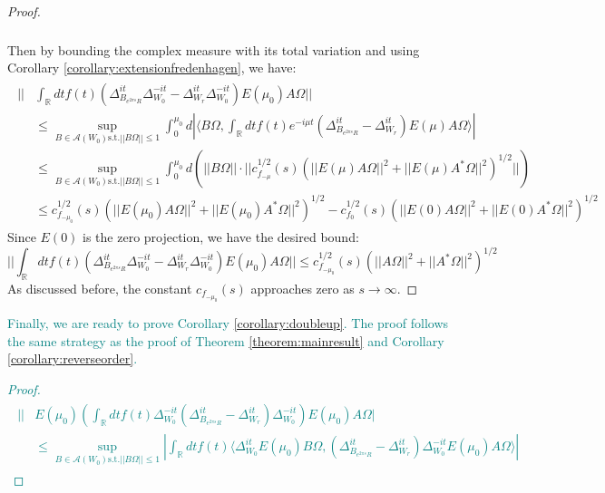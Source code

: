 \documentclass[a4paper,11pt]{article}
\theoremstyle{definition}
\newcommand{\lb}{\left(}
\newcommand{\rb}{\right)}
\newcommand{\YC}[1]{\textcolor{teal}{#1}}
\begin{document}
{{\begin{proof}
\begin{align}
\begin{split}
    \end{split}
\end{align}
Then by bounding the complex measure with its total variation and using Corollary \ref{corollary:extensionfredenhagen}, we have:
\begin{align}
    \begin{split}
        ||&\int_\mathbb{R} dt f(t)\lb\Delta_{B_{e^{2
        \pi s}R}}^{it}\Delta_{W_0}^{-it} - \Delta_{W_r}^{it}\Delta_{W_0}^{-it}\rb E(\mu_0)A\Omega||\\&
        \leq \sup_{B\in\mathcal{A}(W_0)\text{s.t.}||B\Omega||\leq 1}\int_0^{\mu_0}d|\langle B\Omega, \int_\mathbb{R} dt f(t)e^{-i\mu t}\lb\Delta_{B_{e^{2\pi s}R}}^{it} - \Delta_{W_r}^{it}\rb E(\mu) A\Omega\rangle|
        \\&
        \leq \sup_{B\in\mathcal{A}(W_0)\text{s.t.}||B\Omega||\leq 1}\int_0^{\mu_0}d\lb||B\Omega||\cdot||c^{1/2}_{f_{-\mu}}(s)\lb||E(\mu)A\Omega||^2 + ||E(\mu)A^*\Omega||^2\rb^{1/2}||\rb
        \\&
        \leq c^{1/2}_{f_{-\mu_0}}(s)\lb||E(\mu_0)A\Omega||^2 + ||E(\mu_0)A^*\Omega||^2\rb^{1/2} - c^{1/2}_{f_0}(s)\lb||E(0)A\Omega||^2 + ||E(0)A^*\Omega||^2\rb^{1/2}
    \end{split}
\end{align}
Since $E(0)$ is the zero projection, we have the desired bound:
\begin{equation}
    ||\int_\mathbb{R} dt f(t)\lb\Delta_{B_{e^{2
        \pi s}R}}^{it}\Delta_{W_0}^{-it} - \Delta_{W_r}^{it}\Delta_{W_0}^{-it}\rb E(\mu_0)A\Omega|| \leq c_{f_{-\mu_0}}^{1/2}(s)\lb||A\Omega||^2 + ||A^*\Omega||^2\rb^{1/2}
\end{equation}
As discussed before, the constant $c_{f_{-\mu_0}}(s)$ approaches zero as $s\rightarrow\infty$.
\end{proof}
}
\YC{
Finally, we are ready to prove Corollary \ref{corollary:doubleup}. The proof follows the same strategy as the proof of Theorem \ref{theorem:mainresult} and Corollary \ref{corollary:reverseorder}.
\begin{proof}
    \begin{align}
        \begin{split}
            ||&E(\mu_0)\lb\int_\mathbb{R} dt f(t)\Delta_{W_0}^{-it}\lb\Delta_{B_{e^{2\pi s}R}}^{it} - \Delta_{W_r}^{it}\rb\Delta_{W_0}^{-it}\rb E(\mu_0)A\Omega|
            \\&
            \leq \sup_{B\in\mathcal{A}(W_0)\text{s.t.}||B\Omega||\leq 1}|\int_\mathbb{R} dt f(t)\langle \Delta^{it}_{W_0}E(\mu_0)B\Omega, \lb\Delta^{it}_{B_{e^{2\pi s}R}} - \Delta^{it}_{W_r}\rb\Delta_{W_0}^{-it}E(\mu_0) A\Omega\rangle|

\end{split}
\end{align}
\end{proof}}}
\end{document}
